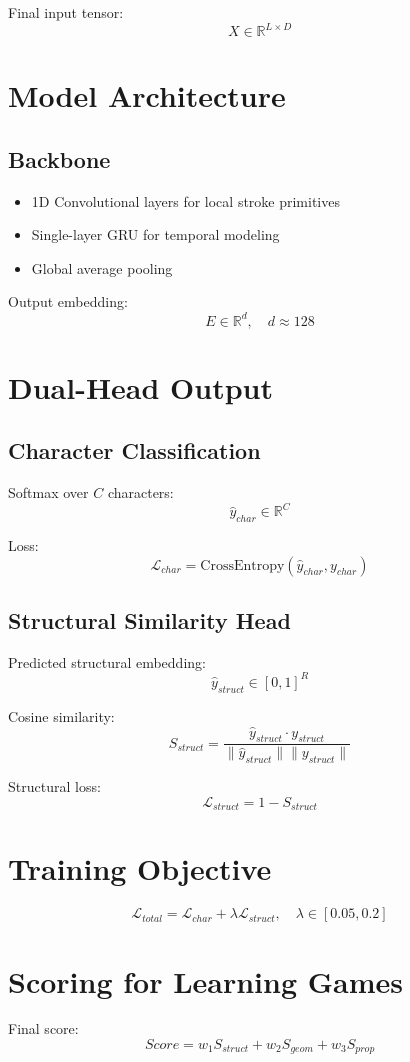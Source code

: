 \documentclass[11pt]{article}
\begin{document}
Final input tensor:
\[
X \in \mathbb{R}^{L \times D}
\]

\section{Model Architecture}

\subsection{Backbone}
\begin{itemize}
\item 1D Convolutional layers for local stroke primitives
\item Single-layer GRU for temporal modeling
\item Global average pooling
\end{itemize}

Output embedding:
\[
E \in \mathbb{R}^{d}, \quad d \approx 128
\]

\section{Dual-Head Output}

\subsection{Character Classification}
Softmax over $C$ characters:
\[
\hat{y}_{char} \in \mathbb{R}^{C}
\]

Loss:
\[
\mathcal{L}_{char} = \text{CrossEntropy}(\hat{y}_{char}, y_{char})
\]

\subsection{Structural Similarity Head}
Predicted structural embedding:
\[
\hat{y}_{struct} \in [0,1]^R
\]

Cosine similarity:
\[
S_{struct} = \frac{\hat{y}_{struct} \cdot y_{struct}}{\|\hat{y}_{struct}\|\|y_{struct}\|}
\]

Structural loss:
\[
\mathcal{L}_{struct} = 1 - S_{struct}
\]

\section{Training Objective}
\[
\mathcal{L}_{total} = \mathcal{L}_{char} + \lambda \mathcal{L}_{struct}, \quad \lambda \in [0.05,0.2]
\]

\section{Scoring for Learning Games}
Final score:
\[
Score = w_1 S_{struct} + w_2 S_{geom} + w_3 S_{prop}
\]
\end{document}
